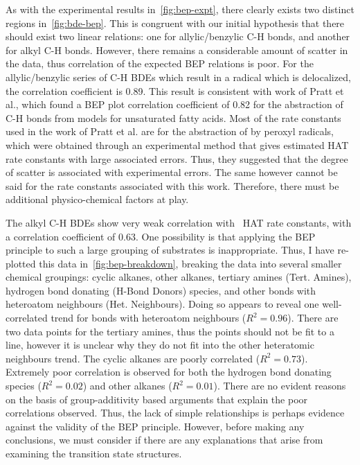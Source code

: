 As with the experimental results in~\ref{fig:bep-expt}, there clearly exists two distinct regions in~\ref{fig:bde-bep}. This is congruent with our initial hypothesis that there should exist two linear relations: one for allylic/benzylic C-H bonds, and another for alkyl C-H bonds. However, there remains a considerable amount of scatter in the data, thus correlation of the expected BEP relations is poor. For the allylic/benzylic series of C-H BDEs which result in a radical which is delocalized, the correlation coefficient is 0.89. This result is consistent with work of Pratt et al.\cite{Pratt2003}, which found a BEP plot correlation coefficient of 0.82 for the abstraction of C-H bonds from models for unsaturated fatty acids. Most of the rate constants used in the work of Pratt et al. are for the abstraction of  by peroxyl radicals, which were obtained through an experimental method that gives estimated HAT rate constants with large associated errors. Thus, they suggested that the degree of scatter is associated with experimental errors. The same however cannot be said for the rate constants associated with this work. Therefore, there must be additional physico-chemical factors at play.

The alkyl C-H BDEs show very weak correlation with \cumo\ HAT rate constants, with a correlation coefficient of 0.63. One possibility is that applying the BEP principle to such a large grouping of substrates is inappropriate. Thus, I have re-plotted this data in~\ref{fig:bep-breakdown}, breaking the data into several smaller chemical groupings: cyclic alkanes, other alkanes, tertiary amines (Tert. Amines), hydrogen bond donating (H-Bond Donors) species, and other  bonds with heteroatom neighbours (Het. Neighbours). Doing so appears to reveal one well-correlated trend for  bonds with heteroatom neighbours ($R^2 = 0.96$). There are two data points for the tertiary amines, thus the points should not be fit to a line, however it is unclear why they do not fit into the other heteratomic neighbours trend. The cyclic alkanes are poorly correlated ($R^2 = 0.73$). Extremely poor correlation is observed for both the hydrogen bond donating species ($R^2 = 0.02$) and other alkanes ($R^2 = 0.01$). There are no evident reasons on the basis of group-additivity based arguments that explain the poor correlations observed. Thus, the lack of simple relationships is perhaps evidence against the validity of the BEP principle. However, before making any conclusions, we must consider if there are any explanations that arise from examining the transition state structures.


